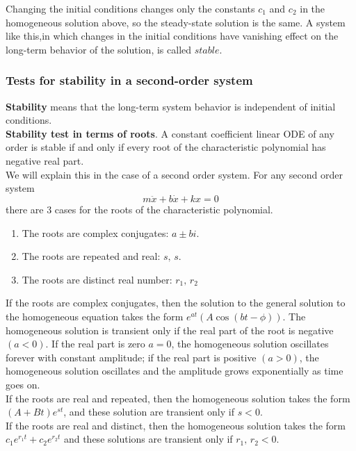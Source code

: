 Changing the initial conditions changes only the constants $c_ 1$ and $c_ 2$ in the homogeneous
solution above, so the steady-state solution is the same.
A system like this,in which changes in the initial conditions have vanishing effect on
the long-term behavior of the solution, is called $stable$. 
\clearpage
\subsubsection{Tests for stability in a second-order system}

\textbf{\color{blue}Stability} means that the long-term system behavior is independent of initial conditions.\\

\textbf{Stability test in terms of roots}.
A constant coefficient linear ODE of any order is stable if and only if every root of
the characteristic polynomial has negative real part.\\

We will explain this in the case of a second order system. For any second order system
\begin{equation*}
  m \ddot{x} + b \dot{x} + kx = 0
\end{equation*}
there are 3 cases for the roots of the characteristic polynomial.
\begin{enumerate}
\item The roots are complex conjugates: $a \pm bi$.
\item The roots are repeated and real: $s,\, s$.
\item The roots are distinct real number: $r_ 1 ,\, r_2$
\end{enumerate}

If the roots are complex conjugates, then the solution to the general solution to the homogeneous equation takes
the form $e^{at} \left(A \cos(bt - \phi) \right)$.
The homogeneous solution is transient only if the real part of the root is negative $(a<0)$.
If the real part is zero $a = 0$, the homogeneous solution oscillates forever
with constant amplitude;
if the real part is positive $(a>0)$, the homogeneous solution oscillates
and the amplitude grows exponentially as time goes on.\\

If the roots are real and repeated, then the homogeneous solution takes the form
$(A + Bt) e^{st}$, and these solution are transient only if $s < 0$.\\

If the roots are real and distinct, then the homogeneous solution takes the form
$c_ 1 e^{r_ 1 t} + c_ 2 e^{r_ 2 t}$ and these solutions are transient only if
$r_ 1 ,\, r_ 2 < 0$. \\

